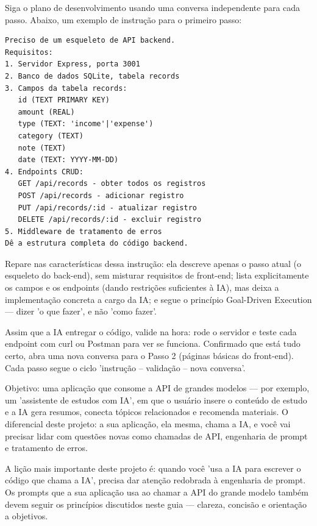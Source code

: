 
Siga o plano de desenvolvimento usando uma conversa independente para cada passo. Abaixo, um exemplo de instrução para o primeiro passo:

\begin{lstlisting}
Preciso de um esqueleto de API backend.
Requisitos:
1. Servidor Express, porta 3001
2. Banco de dados SQLite, tabela records
3. Campos da tabela records:
   id (TEXT PRIMARY KEY)
   amount (REAL)
   type (TEXT: 'income'|'expense')
   category (TEXT)
   note (TEXT)
   date (TEXT: YYYY-MM-DD)
4. Endpoints CRUD:
   GET /api/records - obter todos os registros
   POST /api/records - adicionar registro
   PUT /api/records/:id - atualizar registro
   DELETE /api/records/:id - excluir registro
5. Middleware de tratamento de erros
Dê a estrutura completa do código backend.
\end{lstlisting}

Repare nas características dessa instrução: ela descreve apenas o passo atual (o esqueleto do back-end), sem misturar requisitos de front-end; lista explicitamente os campos e os endpoints (dando restrições suficientes à IA), mas deixa a implementação concreta a cargo da IA; e segue o princípio Goal-Driven Execution — dizer 'o que fazer', e não 'como fazer'.

Assim que a IA entregar o código, valide na hora: rode o servidor e teste cada endpoint com curl ou Postman para ver se funciona. Confirmado que está tudo certo, abra uma nova conversa para o Passo 2 (páginas básicas do front-end). Cada passo segue o ciclo 'instrução – validação – nova conversa'.



Objetivo: uma aplicação que consome a API de grandes modelos — por exemplo, um 'assistente de estudos com IA', em que o usuário insere o conteúdo de estudo e a IA gera resumos, conecta tópicos relacionados e recomenda materiais. O diferencial deste projeto: a sua aplicação, ela mesma, chama a IA, e você vai precisar lidar com questões novas como chamadas de API, engenharia de prompt e tratamento de erros.

A lição mais importante deste projeto é: quando você 'usa a IA para escrever o código que chama a IA', precisa dar atenção redobrada à engenharia de prompt. Os prompts que a sua aplicação usa ao chamar a API do grande modelo também devem seguir os princípios discutidos neste guia — clareza, concisão e orientação a objetivos.

